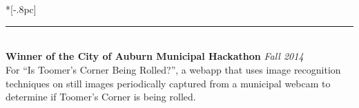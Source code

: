 \documentclass{article}
\begin{document}
\

 \\*[-.8pc]
\rule{\textwidth}{.1pt} \\
{\bf Winner of the City of Auburn Municipal Hackathon} \hfill {\it Fall 2014}\\
For ``Is Toomer's Corner Being Rolled?'', a webapp that uses image recognition
techniques on still images periodically captured from a municipal webcam to determine
if Toomer's Corner is being rolled.
\\ \\
\end{document}
